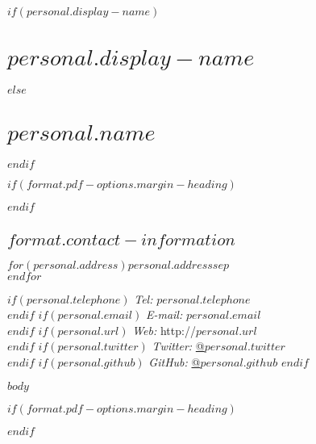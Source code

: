 \documentclass[%
  $if(format.pdf-options.papersize)$
    $format.pdf-options.papersize$paper,
  $endif$
  $format.pdf-options.typesize$,
  oneside
  ]{memoir}
\let\oldsection\section
\renewcommand{\section}[1]{%
  \oldsection{#1}
  \leavevmode
  \par
  \vspace{\dimexpr-\baselineskip-\parskip}
}
\begin{document}
  $if(personal.display-name)$
    \chapter*{$personal.display-name$}
  $else$
    \chapter*{$personal.name$}
  $endif$

$if(format.pdf-options.margin-heading)$
  \begin{adjustwidth*}{9em}{0em}
  \mbox{}
$endif$

  \hypertarget{contact-information}{
  \section{$format.contact-information$}\label{contact-information}}
    \begin{minipage}[t]{0.3\textwidth}
      $for(personal.address)$$personal.address$$sep$\\ $endfor$
    \end{minipage}
    \begin{minipage}[t]{0.7\textwidth}
        $if(personal.telephone)$
        {\textit{Tel:}} $personal.telephone$ \\
        $endif$
        $if(personal.email)$
        {\textit{E-mail:}} $personal.email$ \\
        $endif$
        $if(personal.url)$
        {\textit{Web:}} http://$personal.url$ \\
        $endif$
        $if(personal.twitter)$
        {\textit{Twitter:}} \href{http://twitter.com/$personal.twitter$}{@$personal.twitter$} \\
        $endif$
        $if(personal.github)$
        {\textit{GitHub:}} \href{http://github.com/$personal.github$}{@$personal.github$}
        $endif$
    \end{minipage}
\vspace{-\baselineskip} %
$body$

$if(format.pdf-options.margin-heading)$
  \end{adjustwidth*}
$endif$
\end{document}
